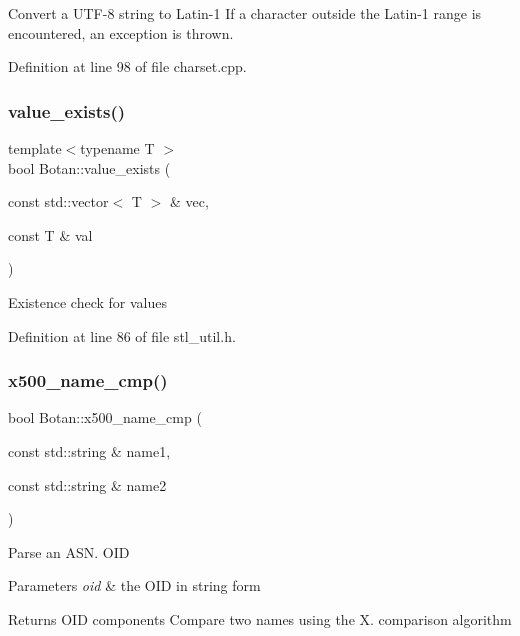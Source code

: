Convert a U\+T\+F-\/8 string to Latin-\/1 If a character outside the Latin-\/1 range is encountered, an exception is thrown. 

Definition at line 98 of file charset.\+cpp.

\mbox{\label{namespace_botan_ae62a85e0371b9210c98d9dcdb1632502}} 
\subsubsection{\texorpdfstring{value\+\_\+exists()}{value\_exists()}}
{\footnotesize\ttfamily template$<$typename T $>$ \\
bool Botan\+::value\+\_\+exists (\begin{DoxyParamCaption}\item[{const std\+::vector$<$ T $>$ \&}]{vec,  }\item[{const T \&}]{val }\end{DoxyParamCaption})}

Existence check for values 

Definition at line 86 of file stl\+\_\+util.\+h.

\mbox{\label{namespace_botan_ab8509bd05c79dd4ea42fda5448fda5b5}} 
\subsubsection{\texorpdfstring{x500\+\_\+name\+\_\+cmp()}{x500\_name\_cmp()}}
{\footnotesize\ttfamily bool Botan\+::x500\+\_\+name\+\_\+cmp (\begin{DoxyParamCaption}\item[{const std\+::string \&}]{name1,  }\item[{const std\+::string \&}]{name2 }\end{DoxyParamCaption})}

Parse an A\+S\+N. O\+ID 
\begin{DoxyParams}{Parameters}
{\em oid} & the O\+ID in string form \\
\hline
\end{DoxyParams}
\begin{DoxyReturn}{Returns}
O\+ID components Compare two names using the X. comparison algorithm 
\end{DoxyReturn}

